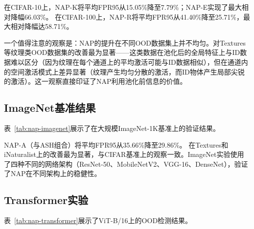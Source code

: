在CIFAR-10上，NAP-K将平均FPR95从15.05\%降至7.79\%；NAP-E实现了最大相对降幅66.03\%。%
在CIFAR-100上，NAP-R将平均FPR95从41.40\%降至25.71\%，最大相对降幅达58.71\%。%

一个值得注意的观察是：NAP的提升在不同OOD数据集上并不均匀。对Textures等纹理类OOD数据集的改善最为显著——这类数据在池化后的全局特征上与ID数据难以区分（因为纹理在每个通道上的平均激活可能与ID数据相似），但在通道内的空间激活模式上差异显著（纹理产生均匀分散的激活，而ID物体产生局部尖锐的激活）。这一观察直接印证了NAP利用池化前信息的价值。

\subsection{ImageNet基准结果}

表~\ref{tab:nap-imagenet}展示了在大规模ImageNet-1K基准上的验证结果。

\begin{table}[htb]
  \centering
  \caption{ImageNet-1K基准上NAP与各方法在四个OOD数据集上的结果}
  \label{tab:nap-imagenet}
\end{table}

NAP-A（与ASH组合）将平均FPR95从35.66\%降至29.86\%。%
在Textures和iNaturalist上的改善最为显著，与CIFAR基准上的观察一致。ImageNet实验使用了四种不同的网络架构（ResNet-50、MobileNetV2\cite{sandler2018mobilenetv2}、VGG-16\cite{simonyan2015very}、DenseNet\cite{huang2017densely}），验证了NAP在不同架构上的稳健性。

\subsection{Transformer实验}

表~\ref{tab:nap-transformer}展示了ViT-B/16\cite{dosovitskiy2020image}上的OOD检测结果。

\begin{table}[htb]
  \centering
  \caption{ViT-B/16上NAP与Energy、MSP基线的OOD检测结果}
  \label{tab:nap-transformer}
\end{table}

